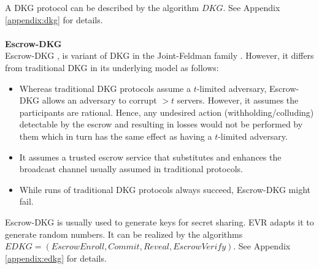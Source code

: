 \documentclass[letterpaper,twocolumn,10pt]{article}
\theoremstyle{definition}
\theoremstyle{remark}
\begin{document}
A DKG protocol can be described by the algorithm $DKG$. See Appendix \ref{appendix:dkg} for details.\\\\
\textbf{Escrow-DKG}\\
Escrow-DKG \cite{david2019rational}, is variant of DKG in the Joint-Feldman
family \cite{gennaro1999secure, gennaro3revisiting}. However, it differs from traditional DKG in its underlying model as follows:
\begin{itemize}
    \item Whereas traditional DKG protocols assume a $t$-limited adversary, Escrow-DKG allows an adversary to corrupt $>t$ servers. However, it assumes the participants are rational. Hence, any undesired action (withholding/colluding) detectable by the escrow and resulting in losses would not be performed by them which in turn has the same effect as having a $t$-limited adversary.
    \item It assumes a trusted escrow service that substitutes and enhances the broadcast channel usually assumed in traditional protocols.
    \item While runs of traditional DKG protocols always succeed, Escrow-DKG might fail.
\end{itemize}
Escrow-DKG is usually used to generate keys for secret sharing. EVR adapts it to generate random numbers. It can be realized by the algorithms $EDKG = (EscrowEnroll, Commit, Reveal, EscrowVerify)$. See Appendix \ref{appendix:edkg} for details.
\end{document}
